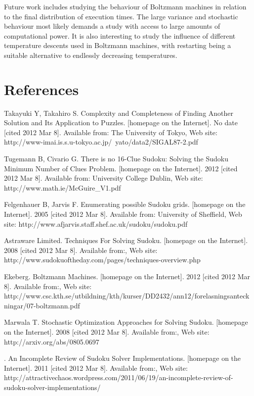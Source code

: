 \documentclass[a4paper,11pt]{kth-mag}
\begin{document}
Future work includes studying the behaviour of Boltzmann machines in relation to the final distribution of execution times.
The large variance and stochastic behaviour most likely demands a study with access to large amounts of computational power.
It is also interesting to study the influence of different temperature descents used in Boltzmann machines, with restarting being a suitable alternative to endlessly decreasing temperatures.

\chapter{References}

\begin{thebibliography}{99}

Takayuki Y, Takahiro S. Complexity and Completeness of Finding Another Solution and Its Application to Puzzles. [homepage on the Internet]. No date [cited 2012 Mar 8]. Available from: The University of Tokyo, Web site: http://www-imai.is.s.u-tokyo.ac.jp/~yato/data2/SIGAL87-2.pdf

Tugemann B, Civario G. There is no 16-Clue Sudoku: Solving the Sudoku Minimum Number of Clues Problem. [homepage on the Internet]. 2012 [cited 2012 Mar 8]. Available from: University College Dublin, Web site: http://www.math.ie/McGuire\_V1.pdf

Felgenhauer B, Jarvis F. Enumerating possible Sudoku grids. [homepage on the Internet]. 2005 [cited 2012 Mar 8]. Available from: University of Sheffield, Web site: http://www.afjarvis.staff.shef.ac.uk/sudoku/sudoku.pdf

Astraware Limited. Techniques For Solving Sudoku. [homepage on the Internet]. 2008 [cited 2012 Mar 8]. Available from:, Web site: http://www.sudokuoftheday.com/pages/techniques-overview.php

Ekeberg. Boltzmann Machines. [homepage on the Internet]. 2012 [cited 2012 Mar 8]. Available from:, Web site: http://www.csc.kth.se/utbildning/kth/kurser/DD2432/ann12/forelasningsanteckningar/07-boltzmann.pdf

Marwala T. Stochastic Optimization Approaches for Solving Sudoku. [homepage on the Internet]. 2008 [cited 2012 Mar 8]. Available from:, Web site: http://arxiv.org/abs/0805.0697

. An Incomplete Review of Sudoku Solver Implementations. [homepage on the Internet]. 2011 [cited 2012 Mar 8]. Available from:, Web site: http://attractivechaos.wordpress.com/2011/06/19/an-incomplete-review-of-sudoku-solver-implementations/


\end{thebibliography}
\end{document}
